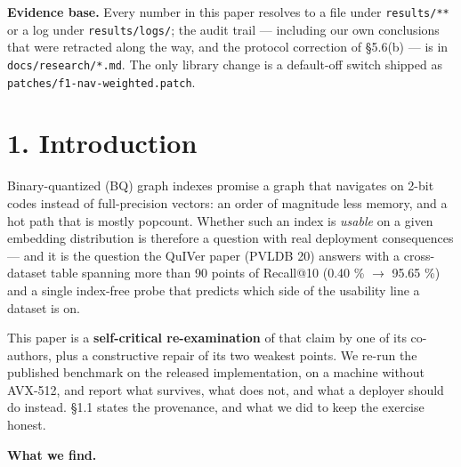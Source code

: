 \documentclass[
  10pt,
]{article}
\begin{document}
{
\setcounter{tocdepth}{3}
\tableofcontents
}
\textbf{Evidence base.} Every number in this paper resolves to a file
under \texttt{results/**} or a log under \texttt{results/logs/}; the
audit trail --- including our own conclusions that were retracted along
the way, and the protocol correction of §5.6(b) --- is in
\texttt{docs/research/*.md}. The only library change is a default-off
switch shipped as \texttt{patches/f1-nav-weighted.patch}.

\section{1. Introduction}\label{introduction}

Binary-quantized (BQ) graph indexes promise a graph that navigates on
2-bit codes instead of full-precision vectors: an order of magnitude
less memory, and a hot path that is mostly popcount. Whether such an
index is \emph{usable} on a given embedding distribution is therefore a
question with real deployment consequences --- and it is the question
the QuIVer paper (PVLDB 20) answers with a cross-dataset table spanning
more than 90 points of Recall@10 (0.40 \% $\rightarrow$ 95.65 \%) and a single
index-free probe that predicts which side of the usability line a
dataset is on.

This paper is a \textbf{self-critical re-examination} of that claim by
one of its co-authors, plus a constructive repair of its two weakest
points. We re-run the published benchmark on the released
implementation, on a machine without AVX-512, and report what survives,
what does not, and what a deployer should do instead. §1.1 states the
provenance, and what we did to keep the exercise honest.

\textbf{What we find.}
\end{document}
